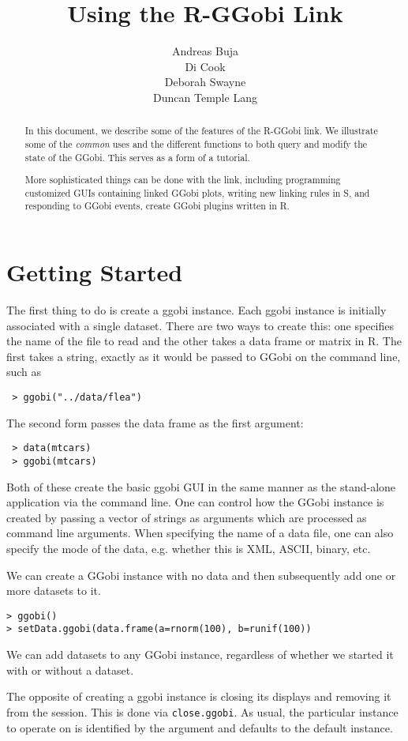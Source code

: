 \documentclass{article}
\title{Using the R-GGobi Link}
\author{Andreas Buja \\
Di Cook \\
Deborah Swayne \\
Duncan Temple Lang}
\def\SFunction#1{{\texttt{\red #1}}}
\begin{document}
\maketitle{}

\begin{abstract}
  In this document, we describe some of the features of the R-GGobi
  link. We illustrate some of the {\em common} uses and the different
  functions to both query and modify the state of the GGobi.  This
  serves as a form of a tutorial.

  More sophisticated things can be done with the link, including
  programming customized GUIs containing linked GGobi plots,
  writing new linking rules in S, and responding to GGobi events,
  create GGobi plugins written in R.
\end{abstract}

\section{Getting Started}
The first thing to do is create a ggobi instance.  Each ggobi instance
is initially associated with a single dataset.  There are two ways to
create this: one specifies the name of the file to read and the other
takes a data frame or matrix in R.  The first takes a string, exactly as it
would be passed to GGobi on the command line, such as
\begin{verbatim}
 > ggobi("../data/flea")
\end{verbatim}
The second form passes the data frame as the first argument:
\begin{verbatim}
 > data(mtcars)
 > ggobi(mtcars)
\end{verbatim}
Both of these create the basic ggobi GUI in the same manner as the
stand-alone application via the command line.  One can control how the
GGobi instance is created by passing a vector of strings as arguments
which are processed as command line arguments.  When specifying the
name of a data file, one can also specify the mode of the data, e.g.
whether this is XML, ASCII, binary, etc.

We can create a GGobi instance with no data and then subsequently
add one or more datasets to it.
\begin{verbatim}
> ggobi()
> setData.ggobi(data.frame(a=rnorm(100), b=runif(100))
\end{verbatim}
We can add datasets to any GGobi instance, regardless of
whether we started it with or without a dataset.


The opposite of creating a ggobi instance is closing its displays and
removing it from the session.  This is done via
\SFunction{close.ggobi}.  As usual, the particular instance to operate
on is identified by the  argument and defaults to the
default instance.
\end{document}

